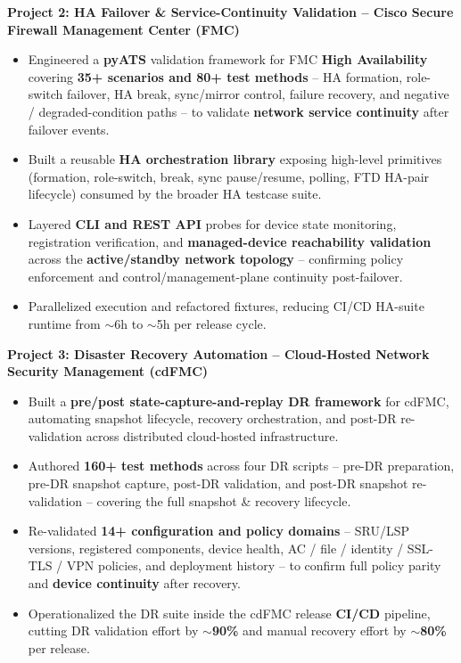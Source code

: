 \documentclass[letterpaper,11pt]{article}
\newcommand{\resumeItem}[1]{
  \item\small{
    {#1 \vspace{-2pt}}
  }
}
\newcommand{\resumeItemListStart}{\begin{itemize}[topsep=2pt, partopsep=0pt, parsep=0pt, itemsep=1pt, leftmargin=0.15in]}
\newcommand{\resumeItemListEnd}{\end{itemize}\vspace{-5pt}}
\begin{document}
\textbf{Project 2: HA Failover \& Service-Continuity Validation -- Cisco Secure Firewall Management Center (FMC)}
\nopagebreak
\resumeItemListStart
  \resumeItem{Engineered a \textbf{pyATS} validation framework for FMC \textbf{High Availability} covering \textbf{35+ scenarios and 80+ test methods} -- HA formation, role-switch failover, HA break, sync/mirror control, failure recovery, and negative / degraded-condition paths -- to validate \textbf{network service continuity} after failover events.}
  \resumeItem{Built a reusable \textbf{HA orchestration library} exposing high-level primitives (formation, role-switch, break, sync pause/resume, polling, FTD HA-pair lifecycle) consumed by the broader HA testcase suite.}
  \resumeItem{Layered \textbf{CLI and REST API} probes for device state monitoring, registration verification, and \textbf{managed-device reachability validation} across the \textbf{active/standby network topology} -- confirming policy enforcement and control/management-plane continuity post-failover.}
  \vspace{-4pt}
  \resumeItem{Parallelized execution and refactored fixtures, reducing CI/CD HA-suite runtime from $\sim$6h to $\sim$5h per release cycle.}
\resumeItemListEnd
\vspace{8pt}

\textbf{Project 3: Disaster Recovery Automation -- Cloud-Hosted Network Security Management (cdFMC)}
\nopagebreak
\resumeItemListStart
  \resumeItem{Built a \textbf{pre/post state-capture-and-replay DR framework} for cdFMC, automating snapshot lifecycle, recovery orchestration, and post-DR re-validation across distributed cloud-hosted infrastructure.}
  \resumeItem{Authored \textbf{160+ test methods} across four DR scripts -- pre-DR preparation, pre-DR snapshot capture, post-DR validation, and post-DR snapshot re-validation -- covering the full snapshot \& recovery lifecycle.}
  \resumeItem{Re-validated \textbf{14+ configuration and policy domains} -- SRU/LSP versions, registered components, device health, AC / file / identity / SSL-TLS / VPN policies, and deployment history -- to confirm full policy parity and \textbf{device continuity} after recovery.}
  \resumeItem{Operationalized the DR suite inside the cdFMC release \textbf{CI/CD} pipeline, cutting DR validation effort by $\sim$\textbf{90\%} and manual recovery effort by $\sim$\textbf{80\%} per release.}
\resumeItemListEnd
\vspace{8pt}
\end{document}
